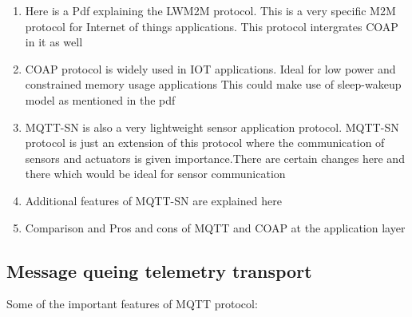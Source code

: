\documentclass[16pt]{article}
\begin{document}
\begin{enumerate}

\item
  Here is a Pdf explaining the LWM2M protocol. This is a very specific
  M2M protocol for Internet of things
  applications.%
  This protocol intergrates COAP in it as well
\item
  COAP protocol is widely used in IOT applications. Ideal for low power
  and constrained memory usage applications
  This could make use of sleep-wakeup model as mentioned in the pdf
\item
  MQTT-SN is also a very lightweight sensor application protocol.
  MQTT-SN protocol is just an extension of this protocol where the
  communication of sensors and actuators is given importance.There are
  certain changes here and there which would be ideal for sensor
  communication
\item
  Additional features of MQTT-SN are explained here
\item
  Comparison and Pros and cons of MQTT and COAP at the application layer
\end{enumerate}

\vspace{0.5cm}

\subsection{Message queing telemetry transport}

\vspace{0.5cm}
Some of the important features of MQTT protocol:
\end{document}
